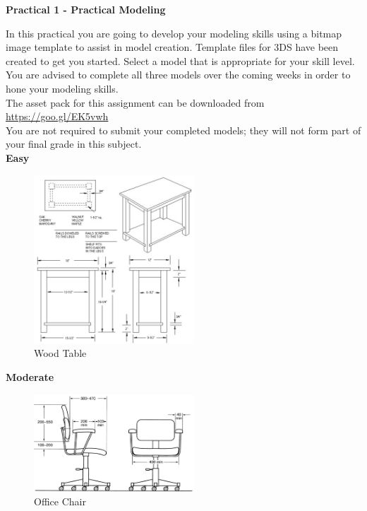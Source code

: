 
	
\begin{flushleft}
\Large\textbf{Practical 1 - Practical Modeling }\\
\end{flushleft}

In this practical you are going to develop your modeling skills using a bitmap image template to assist in model creation.  Template files for 3DS have been created to get you started.  Select a model that is appropriate for your skill level.  You are advised to complete all three models over the coming weeks in order to hone your modeling skills.\\

The asset pack for this assignment can be downloaded from \href{https://goo.gl/EK5vwh}{https://goo.gl/EK5vwh}\\

You are not required to submit your completed models; they will not form part of your final grade in this subject.\\

\vspace{1cm}
\textbf{Easy}\\
\begin{figure}[hb]
	\centering
		\includegraphics[width=6cm]{./img/wood-furniture-plans-1.jpg}
		\caption{Wood Table}
	\label{fig:Table}
\end{figure}


\newpage
\vspace{1cm}
\textbf{Moderate}\\
\begin{figure}[hb]
	\centering
		\includegraphics[width=6cm]{./img/office-chair-2.jpg}
		\caption{Office Chair}
	\label{fig:Office Chair}
\end{figure}


